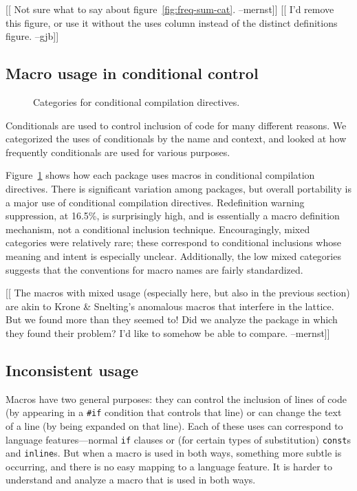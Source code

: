 \documentclass[10pt]{article}
\begin{document}
[[ Not sure what to say about figure~\ref{fig:freq-sum-cat}. --mernst]]
[[ I'd remove this figure, or use it without the uses column instead of
the distinct definitions figure. --gjb]]

\subsection{Macro usage in conditional control}

\begin{figure}
\centerline{}
\caption{Categories for conditional compilation directives.}
\label{fig:ccd-categories}
\end{figure}

Conditionals are used to control inclusion of code for many different
reasons.  We categorized the uses of conditionals by the name and
context, and looked at how frequently conditionals are used for various
purposes.

{}

Figure~\ref{fig:ccd-categories} shows how each package uses macros in
conditional compilation directives.  There is significant variation
among packages, but overall portability is a major use of conditional
compilation directives.  Redefinition warning suppression, at 16.5\%, is
surprisingly high, and is essentially a macro definition mechanism, not
a conditional inclusion technique.  Encouragingly, mixed categories were
relatively rare; these correspond to conditional inclusions whose
meaning and intent is especially unclear.  Additionally, the low mixed
categories suggests that the conventions for macro names are fairly
standardized.

[[ The macros with mixed usage (especially here, but also in the
previous section) are akin to Krone \& Snelting's anomalous macros that
interfere in the lattice.  But we found more than they seemed to!  Did
we analyze the package in which they found their problem?  I'd like to
somehow be able to compare. --mernst]]
      

\subsection{Inconsistent usage}

Macros have two general purposes: they can control the inclusion of
lines of code (by appearing in a \texttt{\#if} condition that controls
that line) or can change the text of a line (by being expanded on that
line).  Each of these uses can correspond to language features---normal
\texttt{if} clauses or (for certain types of substitution) {\tt const}s
and {\tt inline}s.  But when a macro is used in both ways, something
more subtle is occurring, and there is
no easy mapping to a language feature.  It is harder to understand
and analyze a macro that is used in both ways.
\end{document}

